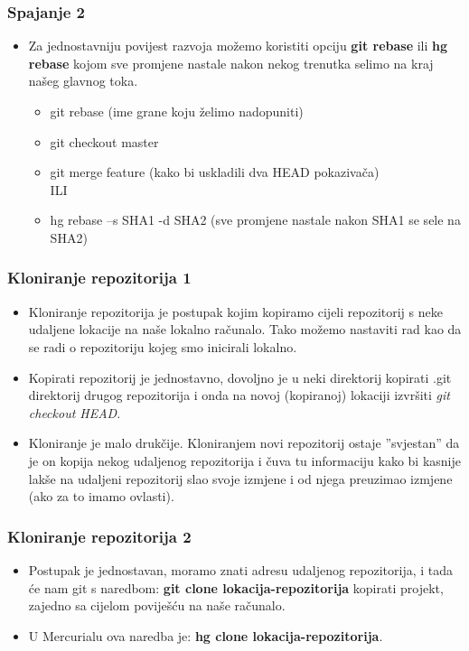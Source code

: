 \documentclass{beamer}
\begin{document}
	\begin{frame}
		\frametitle{Spajanje 2}
		\begin{itemize}
			\item Za jednostavniju povijest razvoja možemo koristiti opciju \textbf{git rebase} ili \textbf{hg rebase} kojom sve promjene nastale nakon nekog trenutka selimo na kraj našeg glavnog toka.
			\begin{itemize}
				\item git rebase (ime grane koju želimo nadopuniti)
 				\item git checkout master
				\item git merge feature (kako bi uskladili dva HEAD pokazivača)
				\\ILI
				\item hg rebase –s SHA1 -d SHA2 (sve promjene nastale nakon SHA1 se sele na SHA2)
			\end{itemize}
		\end{itemize}
	\end{frame}
	
	\begin{frame}
		\frametitle{Kloniranje repozitorija 1}
		\begin{itemize}
			\item Kloniranje repozitorija je postupak kojim kopiramo cijeli repozitorij s neke udaljene lokacije na naše lokalno računalo. Tako možemo nastaviti rad kao da se radi o repozitoriju kojeg smo inicirali lokalno.
			\item Kopirati repozitorij je jednostavno, dovoljno je u neki direktorij kopirati .git direktorij drugog repozitorija i onda na novoj (kopiranoj) lokaciji izvršiti \textit{git checkout HEAD}.
			\item Kloniranje je malo drukčije. Kloniranjem novi repozitorij ostaje ”svjestan” da je on kopija nekog udaljenog repozitorija i čuva tu informaciju kako bi kasnije lakše na udaljeni repozitorij slao svoje izmjene i od njega preuzimao izmjene (ako za to imamo ovlasti).
		\end{itemize}
	\end{frame}
	
	\begin{frame}
		\frametitle{Kloniranje repozitorija 2}
		\begin{itemize}
			\item Postupak je jednostavan, moramo znati adresu udaljenog repozitorija, i tada će nam git s naredbom: \textbf{git clone lokacija-repozitorija} kopirati projekt, zajedno sa cijelom poviješću na naše računalo.
			\item U Mercurialu ova naredba je: \textbf{hg clone lokacija-repozitorija}.
		\end{itemize}
	\end{frame}
\end{document}
